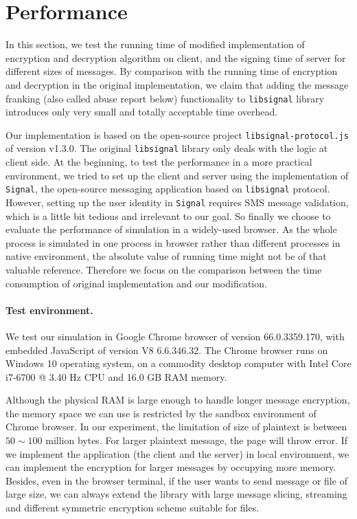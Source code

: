 
\section{Performance}
In this section, we test the running time of modified implementation of encryption and decryption algorithm on client,
and the signing time of server for different sizes of messages.
By comparison with the running time of encryption and decryption in the original implementation,
we claim that adding the message franking (also called abuse report below) functionality to \texttt{libsignal} library introduces only very small and totally acceptable time overhead. 


Our implementation is based on the open-source project \texttt{libsignal-protocol.js} of version v1.3.0.
The original \texttt{libsignal} library only deals with the logic at client side.
At the beginning, to test the performance in a more practical environment,
we tried to set up the client and server using the implementation of \texttt{Signal}, the open-source messaging application based on \texttt{libsignal} protocol.
However, setting up the user identity in \texttt{Signal} requires SMS message validation,
which is a little bit tedious and irrelevant to our goal.
So finally we choose to evaluate the performance of simulation in a widely-used browser.
As the whole process 
is simulated in one process in browser rather than different processes in native environment,
the absolute value of running time might not be of that valuable reference.
Therefore we focus on the comparison between the time consumption of original implementation and our modification.



\paragraph{Test environment.}
We test our simulation in Google Chrome browser of version 66.0.3359.170,
with embedded JavaScript of version V8 6.6.346.32.
The Chrome browser runs on Windows 10 operating system,
on a commodity desktop computer with Intel Core i7-6700 @ 3.40 Hz CPU and 16.0 GB RAM memory.


Although the physical RAM is large enough to handle longer message encryption,
the memory space we can use is restricted by the sandbox environment of Chrome browser.
In our experiment, the limitation of size of plaintext is between $50 \sim 100$ million bytes.
For larger plaintext message, the page will throw error.
If we implement the application (the client and the server) in local environment,
we can implement the encryption for larger messages by occupying more memory.
Besides, even in the browser terminal,
if the user wants to send message or file of large size,
we can always extend the library with large message slicing, streaming and different symmetric encryption scheme suitable for files.


